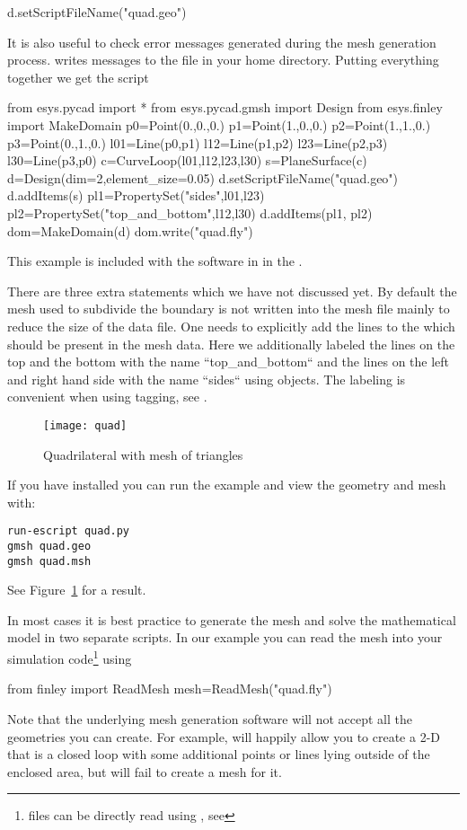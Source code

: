 \begin{python}
  d.setScriptFileName("quad.geo")
\end{python}
It is also useful to check error messages generated during the mesh generation
process. \gmshextern writes messages to the file  in your
home directory.
Putting everything together we get the script
\begin{python}
  from esys.pycad import *
  from esys.pycad.gmsh import Design
  from esys.finley import MakeDomain
  p0=Point(0.,0.,0.)
  p1=Point(1.,0.,0.)
  p2=Point(1.,1.,0.)
  p3=Point(0.,1.,0.)
  l01=Line(p0,p1)
  l12=Line(p1,p2)
  l23=Line(p2,p3)
  l30=Line(p3,p0)
  c=CurveLoop(l01,l12,l23,l30)
  s=PlaneSurface(c)
  d=Design(dim=2,element_size=0.05)
  d.setScriptFileName("quad.geo")
  d.addItems(s)
  pl1=PropertySet("sides",l01,l23)
  pl2=PropertySet("top_and_bottom",l12,l30)
  d.addItems(pl1, pl2)
  dom=MakeDomain(d)
  dom.write("quad.fly")
\end{python}
This example is included with the software in  in the
\ExampleDirectory.

There are three extra statements which we have not discussed yet.
By default the mesh used to subdivide the boundary is not written into the
mesh file mainly to reduce the size of the data file.
One needs to explicitly add the lines to the \Design which should be present
in the mesh data. Here we additionally labeled the lines on the top and the
bottom with the name ``top_and_bottom`` and the lines on the left and right
hand side with the name ``sides`` using  objects.
The labeling is convenient when using tagging, see .

\begin{figure}
\centerline{\texttt{[image: quad]}}
\caption{Quadrilateral with mesh of triangles}
\label{fig:PYCAD 0}
\end{figure}

If you have \gmshextern installed you can run the example and view the
geometry and mesh with:
\begin{verbatim}
run-escript quad.py
gmsh quad.geo
gmsh quad.msh
\end{verbatim}
See Figure~\ref{fig:PYCAD 0} for a result.

In most cases it is best practice to generate the mesh and solve the
mathematical model in two separate scripts. In our example you can read the
\finley mesh into your simulation code\footnote{\gmshextern files can be
directly read using , see } using
\begin{python}
  from finley import ReadMesh
  mesh=ReadMesh("quad.fly")
\end{python}
Note that the underlying mesh generation software will not accept all
the geometries you can create.  For example, \pycad will happily allow
you to create a 2-D  that is a closed loop with some
additional points or lines lying outside of the enclosed area, but
\gmshextern will fail to create a mesh for it.

